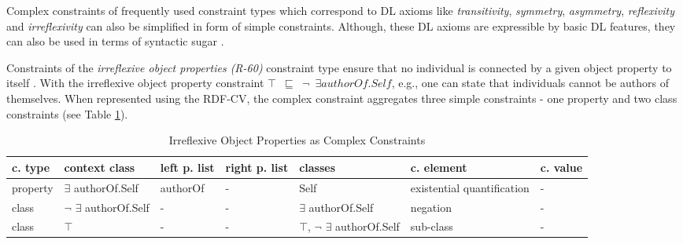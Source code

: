 \documentclass[a4paper,fontsize=11pt]{scrartcl}
\newcommand{\ms}[1]{\texttt{#1}}
\begin{document}
Complex constraints of frequently used constraint types which correspond to DL axioms like \emph{transitivity}, \emph{symmetry}, \emph{asymmetry}, \emph{reflexivity} and \emph{irreflexivity} can also be simplified in form of simple constraints. Although, these DL axioms are expressible by basic DL features, they can also be used in terms of syntactic sugar \cite{BoschEckert2015-2}.

Constraints of the \emph{irreflexive object properties (R-60)} constraint type ensure that no individual is connected by a given object property to itself \cite{Kroetzsch2012}. With the irreflexive object property constraint {\small\ms{$\top$ $\sqsubseteq$ $\neg$ $\exists authorOf.Self$}}, e.g., one can state that individuals cannot be authors of themselves. When represented using the RDF-CV, the complex constraint aggregates three simple constraints - one property and two class constraints (see Table \ref{tab:irreflexive-object-properties-as-complex-constraints}).


\begin{table}[H]
  \scriptsize
  \sffamily
  \vspace{0cm}
	\caption{Irreflexive Object Properties as Complex Constraints}
	\label{tab:irreflexive-object-properties-as-complex-constraints}
	\centering
		\begin{tabular}{l|l|l|l|l|l|l}
      \textbf{c. type} & \textbf{context class} & \textbf{left p. list} & \textbf{right p. list} & \textbf{classes} & \textbf{c. element} & \textbf{c. value} \\
      \hline
property & $\exists$ authorOf.Self & authorOf & - & Self & existential quantification & - \\
class & $\neg$ $\exists$ authorOf.Self & - & - & $\exists$ authorOf.Self & negation & - \\
class & $\top$ & - & - & $\top$, $\neg$ $\exists$ authorOf.Self & sub-class & - \\
		\end{tabular}
\end{table}
\end{document}
